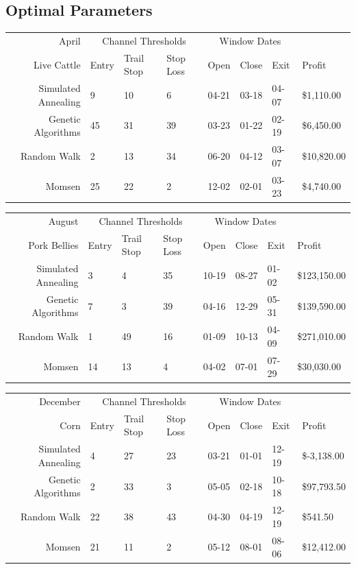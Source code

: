 \documentclass[12pt]{article}
\begin{document}
\pagebreak
\subsection{Optimal Parameters}

\begin{tabular}{|r|l|l|l|l|l|l|l|}
  \hline
  April & \multicolumn{3}{|c|}{Channel Thresholds} & \multicolumn{3}{|c|}{Window Dates} &  \\
  Live Cattle & Entry & Trail Stop & Stop Loss & Open & Close & Exit & Profit\\ \hline
  Simulated Annealing & 9 & 10 & 6 & 04-21 & 03-18 & 04-07 & \$1,110.00 \\ \hline
  Genetic Algorithms & 45 & 31 & 39 & 03-23 & 01-22 & 02-19 & \$6,450.00 \\ \hline
  Random Walk & 2 & 13 & 34 & 06-20 & 04-12 & 03-07 & \$10,820.00 \\ \hline
  Momsen & 25 & 22 & 2 & 12-02 & 02-01 & 03-23 & \$4,740.00 \\ \hline
\end{tabular}

\begin{tabular}{|r|l|l|l|l|l|l|l|}
  \hline
  August & \multicolumn{3}{|c|}{Channel Thresholds} & \multicolumn{3}{|c|}{Window Dates} &  \\
  Pork Bellies & Entry & Trail Stop & Stop Loss & Open & Close & Exit & Profit\\ \hline
  Simulated Annealing & 3 & 4 & 35 & 10-19 & 08-27 & 01-02 & \$123,150.00 \\ \hline
  Genetic Algorithms & 7 & 3 & 39 & 04-16 & 12-29 & 05-31 & \$139,590.00 \\ \hline
  Random Walk & 1 & 49 & 16 & 01-09 & 10-13 & 04-09 & \$271,010.00 \\ \hline
  Momsen &  14 & 13 & 4 & 04-02 & 07-01 & 07-29 & \$30,030.00 \\ \hline
\end{tabular}

\begin{tabular}{|r|l|l|l|l|l|l|l|}
  \hline
  December & \multicolumn{3}{|c|}{Channel Thresholds} & \multicolumn{3}{|c|}{Window Dates} &  \\
  Corn & Entry & Trail Stop & Stop Loss & Open & Close & Exit & Profit\\ \hline
  Simulated Annealing & 4 & 27 & 23 & 03-21 & 01-01 & 12-19 & \$-3,138.00 \\ \hline
  Genetic Algorithms & 2 & 33 & 3 & 05-05 & 02-18 & 10-18 & \$97,793.50 \\ \hline
  Random Walk & 22 & 38 & 43 & 04-30 & 04-19 & 12-19 & \$541.50 \\ \hline
  Momsen & 21 & 11 & 2 & 05-12 & 08-01 & 08-06 & \$12,412.00 \\ \hline
\end{tabular}
\end{document}
